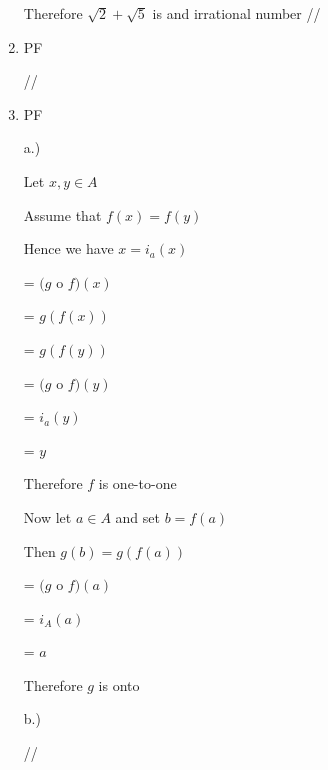 \documentclass[12pt]{article}
\begin{document}
\begin{enumerate}
{Therefore $\sqrt{2} + \sqrt{5} $ is and irrational number
//
}

\item 

{PF


//
}

\item 

{PF

a.)

Let $x,y \in A$

Assume that $f(x) = f(y)$

Hence we have $x = i_{a}(x)$

= $(g$ o $f)(x)$

= $g(f(x))$

= $g(f(y))$

= $(g $ o $f)(y)$

= $i_{a}(y)$

= $y$

Therefore $f$ is one-to-one

Now let $a \in A$ and set $b= f(a)$

Then $g(b) = g(f(a))$

= $(g$ o $f)(a)$

= $i_{A}(a)$

= $a$

Therefore $g$ is onto


b.)

//
}









\end{enumerate}
\end{document}
